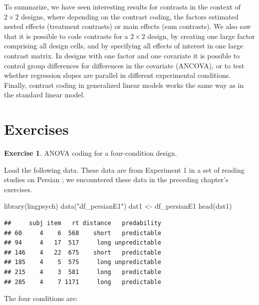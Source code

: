 \documentclass[
  12pt,
]{krantz}
\newenvironment{Shaded}{\begin{snugshade}}{\end{snugshade}}
\newcommand{\FunctionTok}[1]{\textcolor[rgb]{0.00,0.00,0.00}{#1}}
\newcommand{\NormalTok}[1]{#1}
\newcommand{\OtherTok}[1]{\textcolor[rgb]{0.56,0.35,0.01}{#1}}
\newcommand{\StringTok}[1]{\textcolor[rgb]{0.31,0.60,0.02}{#1}}
\theoremstyle{definition}
\theoremstyle{definition}
\theoremstyle{definition}
\newtheorem{exercise}{Exercise}[chapter]
\theoremstyle{definition}
\theoremstyle{remark}
\begin{document}
To summarize, we have seen interesting results for contrasts in the context of \(2 \times 2\) designs, where depending on the contrast coding, the factors estimated nested effects (treatment contrasts) or main effects (sum contrasts). We also saw that it is possible to code contrasts for a \(2 \times 2\) design, by creating one large factor comprising all design cells, and by specifying all effects of interest in one large contrast matrix. In designs with one factor and one covariate it is possible to control group differences for differences in the covariate (ANCOVA), or to test whether regression slopes are parallel in different experimental conditions. Finally, contrast coding in generalized linear models works the same way as in the standard linear model.

\hypertarget{sec:Contrasts2x2exercises}{%
\section{Exercises}\label{sec:Contrasts2x2exercises}}

\begin{exercise}
\protect\hypertarget{exr:Contrasts2x2PersianANOVA}{}\label{exr:Contrasts2x2PersianANOVA}ANOVA coding for a four-condition design.
\end{exercise}

Load the following data. These data are from Experiment 1 in a set of reading studies on Persian \citep{SafaviEtAlFrontiers2016}; we encountered these data in the preceding chapter's exercises.

\begin{Shaded}
\begin{Highlighting}[]
\FunctionTok{library}\NormalTok{(lingpsych)}
\FunctionTok{data}\NormalTok{(}\StringTok{"df\_persianE1"}\NormalTok{)}
\NormalTok{dat1 }\OtherTok{\textless{}{-}}\NormalTok{ df\_persianE1}
\FunctionTok{head}\NormalTok{(dat1)}
\end{Highlighting}
\end{Shaded}

\begin{verbatim}
##     subj item   rt distance   predability
## 60     4    6  568    short   predictable
## 94     4   17  517     long unpredictable
## 146    4   22  675    short   predictable
## 185    4    5  575     long unpredictable
## 215    4    3  581     long   predictable
## 285    4    7 1171     long   predictable
\end{verbatim}

The four conditions are:
\end{document}
